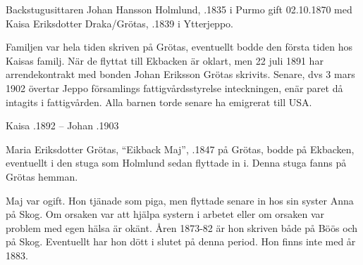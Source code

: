 Backstugusittaren Johan Hansson Holmlund, .1835 i Purmo gift 02.10.1870 med Kaisa Eriksdotter Draka/Grötas, .1839  i Ytterjeppo.
\begin{jhchildren}
  \item {}
  \item {}
  \item {}
  \item {}
\end{jhchildren}
Familjen var hela tiden skriven på Grötas, eventuellt bodde den första tiden hos Kaisas familj. När de flyttat till Ekbacken är oklart, men 22 juli 1891 har arrendekontrakt med bonden Johan Eriksson Grötas  skrivits. Senare, dvs 3 mars 1902 övertar Jeppo församlings fattigvårdsstyrelse inteckningen, enär paret då intagits i fattigvården. Alla barnen torde senare ha emigrerat till USA.

 Kaisa .1892  --	Johan .1903


Maria Eriksdotter Grötas, ``Eikback Maj'', .1847 på Grötas, bodde på Ekbacken, eventuellt i den stuga som Holmlund sedan flyttade in i. Denna stuga fanns på Grötas hemman.

Maj var ogift. Hon tjänade som piga, men flyttade senare in hos sin syster Anna på Skog. Om orsaken var att hjälpa systern i arbetet eller om orsaken var problem med egen hälsa är okänt.  Åren 1873-82 är hon skriven både på Böös och på 	Skog. Eventuellt har hon dött i slutet på denna period. Hon finns inte med år 1883.




